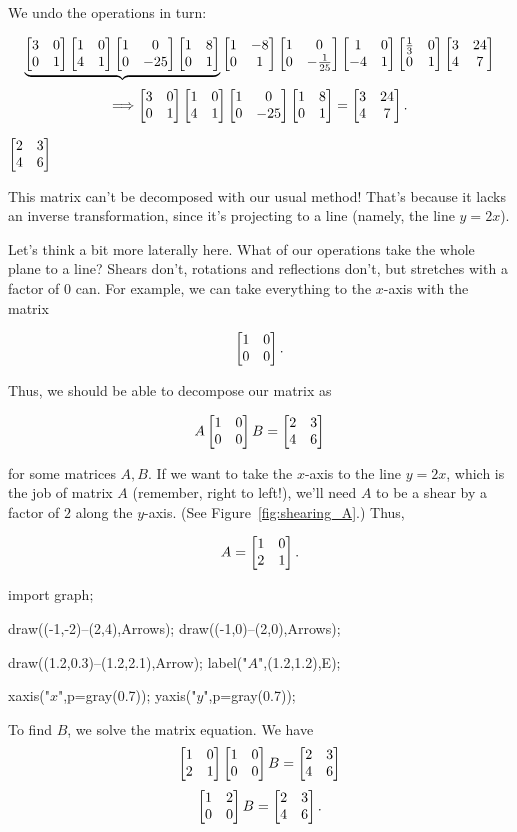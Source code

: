 \documentclass[../gatm_answers.tex]{subfiles}
\begin{document}
\begin{iinner_problem}
\begin{iinner_problem}
\begin{iinner_problem}
We undo the operations in turn:

$$\underbrace{\begin{bmatrix} 3 & 0 \\ 0 & 1 \end{bmatrix}\begin{bmatrix} 1 & 0 \\ 4 & 1 \end{bmatrix}\begin{bmatrix} 1 & 0 \\ 0 & -25 \end{bmatrix}\begin{bmatrix} 1 & 8 \\ 0 & 1 \end{bmatrix}}\begin{bmatrix} 1 & -8 \\ 0 & 1 \end{bmatrix}\begin{bmatrix} 1 & 0 \\ 0 & -\frac{1}{25} \end{bmatrix}\begin{bmatrix} 1 & 0 \\ -4 & 1 \end{bmatrix}\begin{bmatrix} \frac{1}{3} & 0 \\ 0 & 1 \end{bmatrix}\begin{bmatrix} 3 & 24 \\ 4 & 7 \end{bmatrix}$$
$$\Longrightarrow \begin{bmatrix} 3 & 0 \\ 0 & 1 \end{bmatrix}\begin{bmatrix} 1 & 0 \\ 4 & 1 \end{bmatrix}\begin{bmatrix} 1 & 0 \\ 0 & -25 \end{bmatrix}\begin{bmatrix} 1 & 8 \\ 0 & 1 \end{bmatrix} = \begin{bmatrix} 3 & 24 \\ 4 & 7 \end{bmatrix}.$$

\begin{inner_problem}
\item $\begin{bmatrix} 2 & 3 \\ 4 & 6 \end{bmatrix}$
\end{inner_problem}

This matrix can't be decomposed with our usual method! That's because it lacks an inverse transformation, since it's projecting to a line (namely, the line $y=2x$).

Let's think a bit more laterally here. What of our operations take the whole plane to a line? Shears don't, rotations and reflections don't, but stretches with a factor of $0$ can. For example, we can take everything to the $x$-axis with the matrix

$$\begin{bmatrix} 1 & 0 \\ 0 & 0 \end{bmatrix}.$$

Thus, we should be able to decompose our matrix as

$$A\begin{bmatrix} 1 & 0 \\ 0 & 0 \end{bmatrix}B=\begin{bmatrix} 2 & 3 \\ 4 & 6 \end{bmatrix}$$

for some matrices $A,B$. If we want to take the $x$-axis to the line $y=2x$, which is the job of matrix $A$ (remember, right to left!), we'll need $A$ to be a shear by a factor of $2$ along the $y$-axis. (See Figure~\ref{fig:shearing_A}.) Thus,

$$A=\begin{bmatrix} 1 & 0 \\ 2 & 1 \end{bmatrix}.$$

\begin{center}
	\begin{asy}[width=0.26\textwidth]
		import graph;

		draw((-1,-2)--(2,4),Arrows);
		draw((-1,0)--(2,0),Arrows);

		draw((1.2,0.3)--(1.2,2.1),Arrow);
		label("$A$",(1.2,1.2),E);

		xaxis("$x$",p=gray(0.7));
		yaxis("$y$",p=gray(0.7));
	\end{asy}
	\label{fig:shearing_A}
\end{center}

To find $B$, we solve the matrix equation. We have $$\begin{bmatrix} 1 & 0 \\ 2 & 1 \end{bmatrix}\begin{bmatrix} 1 & 0 \\ 0 & 0 \end{bmatrix}B=\begin{bmatrix} 2 & 3 \\ 4 & 6 \end{bmatrix}$$
$$\begin{bmatrix} 1 & 2 \\ 0 & 0 \end{bmatrix}B=\begin{bmatrix} 2 & 3 \\ 4 & 6 \end{bmatrix}.$$


\end{iinner_problem}
\end{iinner_problem}
\end{iinner_problem}
\end{document}
